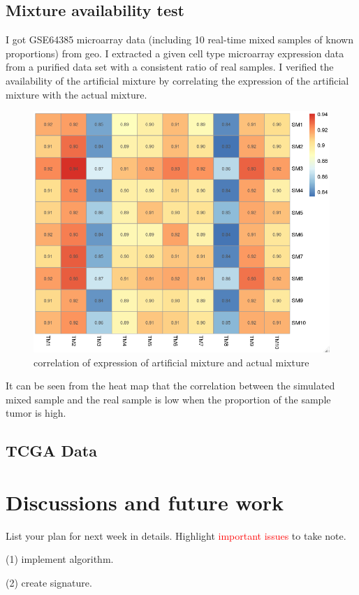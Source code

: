 \documentclass{article}
\newcommand\todo[1]{\textcolor{red}{#1}}
\begin{document}
\subsection{Mixture availability test}
I got GSE64385 microarray data (including 10 real-time mixed samples of known proportions) from geo. I extracted a given cell type microarray expression data from a purified data set with a consistent ratio of real samples. I verified the availability of the artificial mixture by correlating the expression of the artificial mixture with the actual mixture.
\begin{figure}[H]
     \centering
     \includegraphics[width=5in]{cormixture.png}
     \caption{correlation of expression of artificial mixture and actual mixture}
     \label{fig:my_label}
\end{figure}
It can be seen from the heat map that the correlation between the simulated mixed sample and the real sample is low when the proportion of the sample tumor is high.

\subsection{TCGA Data}
 
\section{Discussions and future work}
List your plan for next week in details. Highlight \todo{important issues} to take note.


(1) implement algorithm.

(2) create signature.



\end{document}
